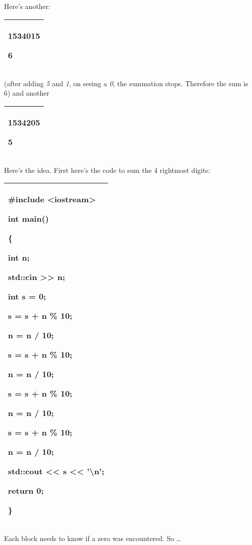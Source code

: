 \documentclass[
]{article}
\begin{document}
Here's another:

\begin{longtable}[]{@{}l@{}}
\toprule
\endhead
\begin{minipage}[t]{0.97\columnwidth}\raggedright
\textbf{1534015}

6\strut
\end{minipage}\tabularnewline
\bottomrule
\end{longtable}

(after adding \emph{5} and \emph{1}, on seeing a \emph{0}, the summation
stops. Therefore the sum is 6) and another

\begin{longtable}[]{@{}l@{}}
\toprule
\endhead
\begin{minipage}[t]{0.97\columnwidth}\raggedright
\textbf{1534205}

5\strut
\end{minipage}\tabularnewline
\bottomrule
\end{longtable}

Here's the idea. First here's the code to sum the 4 rightmost digits:

\begin{longtable}[]{@{}l@{}}
\toprule
\endhead
\begin{minipage}[t]{0.97\columnwidth}\raggedright
\#include \textless iostream\textgreater{}

int main()

\{

int n;

std::cin \textgreater\textgreater{} n;

int s = 0;

s = s + n \% 10;

n = n / 10;

s = s + n \% 10;

n = n / 10;

s = s + n \% 10;

n = n / 10;

s = s + n \% 10;

n = n / 10;

std::cout \textless\textless{} s \textless\textless{}
'\textbackslash n';

return 0;

\}\strut
\end{minipage}\tabularnewline
\bottomrule
\end{longtable}

Each block needs to know if a zero was encountered. So \ldots{}
\end{document}

